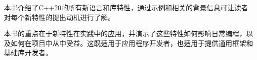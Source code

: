 本书介绍了C++20的所有新语言和库特性，通过示例和相关的背景信息可让读者对每个新特性的提出动机进行了解。

本书的重点在于新特性在实践中的应用，并演示了这些特性如何影响日常编程，以及如何在项目中从中受益。这既适用于应用程序开发者，也适用于提供通用框架和基础库开发者。